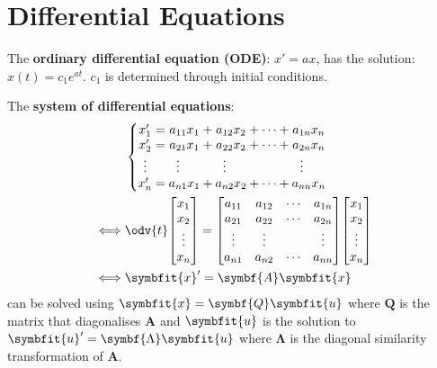 \documentclass{article}
\begin{document}
\section*{Differential Equations}
The \textbf{ordinary differential equation (ODE)}: \(x' = a x\),
has the solution: \(x(t) = c_1 e^{a t}\). \(c_1\) is determined through
initial conditions.
\begin{multicols*}{2}
    The \textbf{system of differential equations}:
    \begin{align*}
               & \left\{
        \setlength\arraycolsep{0pt}
        \begin{array}{ c >{{}}c<{{}} c >{{}}c<{{}} c >{{}}c<{{}} c >{{}}c<{{}} c  }
            x'_1               & = & a_{11}x_1                         & + & a_{12}x_2                         & + & \cdots & + & a_{1n}x_n                         \\
            x'_2               & = & a_{21}x_1                         & + & a_{22}x_2                         & + & \cdots & + & a_{2n}x_n                         \\
            \vdotswithin{x'_3} &   & \vdotswithin{a_{31}}\phantom{x_1} &   & \vdotswithin{a_{32}}\phantom{x_2} &   &        &   & \vdotswithin{a_{3n}}\phantom{x_n} \\
            x'_n               & = & a_{n1}x_1                         & + & a_{n2}x_2                         & + & \cdots & + & a_{nn}x_n
        \end{array}
        \right.                                                           \\
        \iff
               & \odv{t}\mqty[x_1                                          \\ x_2 \\ \vdots \\ x_n] = \mqty[
        a_{11} & a_{12}                                 & \cdots & a_{1n} \\
        a_{21} & a_{22}                                 & \cdots & a_{2n} \\
        \vdots & \vdots                                 &        & \vdots \\
        a_{n1} & a_{n2}                                 & \cdots & a_{nn}
        ] \mqty[x_1                                                       \\ x_2 \\ \vdots \\ x_n] \\
        \iff   & \symbfit{x}' = \symbf{A} \symbfit{x}
    \end{align*}
    can be solved using \(\symbfit{x}=\symbf{Q}\symbfit{u}\) where
    \(\symbf{Q}\) is the matrix that diagonalises \(\symbf{A}\) and
    \(\symbfit{u}\) is the solution to \(\symbfit{u}' = \symbf{\Lambda} \symbfit{u}\) where
    \(\symbf{\Lambda}\) is the diagonal similarity transformation of \(\symbf{A}\).


\end{multicols*}
\end{document}

